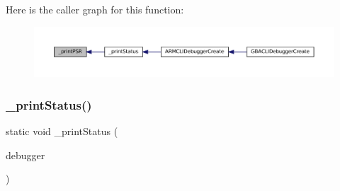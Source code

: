 Here is the caller graph for this function\+:
\nopagebreak
\begin{figure}[H]
\begin{center}
\leavevmode
\includegraphics[width=350pt]{arm_2debugger_2cli-debugger_8c_abc2146e29b6db97677ad3a8321d42ffe_icgraph}
\end{center}
\end{figure}
\mbox{\label{arm_2debugger_2cli-debugger_8c_a1bce4490785068fd42fca65db1fb21ad}} 
\subsubsection{\texorpdfstring{\+\_\+print\+Status()}{\_printStatus()}}
{\footnotesize\ttfamily static void \+\_\+print\+Status (\begin{DoxyParamCaption}\item[{struct C\+L\+I\+Debugger\+System $\ast$}]{debugger }\end{DoxyParamCaption})\hspace{0.3cm}{\ttfamily [static]}}

